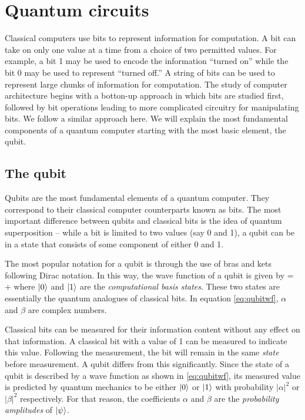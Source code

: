 \chapter{Quantum circuits\label{ch:qcirc}}

Classical computers use bits to represent information for computation. A bit can take on only one value at a time from a choice of two permitted values. For example, a bit 1 may be used to encode the information ``turned on'' while the bit 0 may be used to represent ``turned off.'' A string of bits can be used to represent large chunks of information for computation. The study of computer architecture begins with a botton-up approach in which bits are studied first, followed by bit operations leading to more complicated circuitry for manipulating bits. We follow a similar approach here. We will explain the most fundamental components of a quantum computer starting with the most basic element, the qubit.

\section{The qubit}
Qubits are the most fundamental elements of a quantum computer. They correspond to their classical computer counterparts known as bits. The most important difference between qubits and classical bits is the idea of quantum superposition -- while a bit is limited to two values (say 0 and 1), a qubit can be in a state that consists of some component of either 0 and 1. 

The most popular notation for a qubit is through the use of bras and kets following Dirac notation. In this way, the wave function of a qubit is given by
\beq
\label{eq:qubitwf}
\ketp = \alpha{} + \beta{}
\eeq
where $|0\rangle$ and $|1\rangle$ are the \textit{computational basis states}. These two states are essentially the quantum analogues of classical bits. In equation \eqref{eq:qubitwf}, $\alpha$ and $\beta$ are complex numbers. 

Classical bits can be measured for their information content without any effect on that information. A classical bit with a value of 1 can be measured to indicate this value. Following the measurement, the bit will remain in the same \textit{state} before measurement. A qubit differs from this significantly. Since the state of a qubit is described by a wave function as shown in \eqref{eq:qubitwf}, its measured value is predicted by quantum mechanics to be either $|0\rangle$ or $|1\rangle$ with probability $|\alpha|^2$ or $|\beta|^2$ respectively. For that reason, the coefficients $\alpha$ and $\beta$ are the \textit{probability amplitudes} of $|\psi\rangle$.


